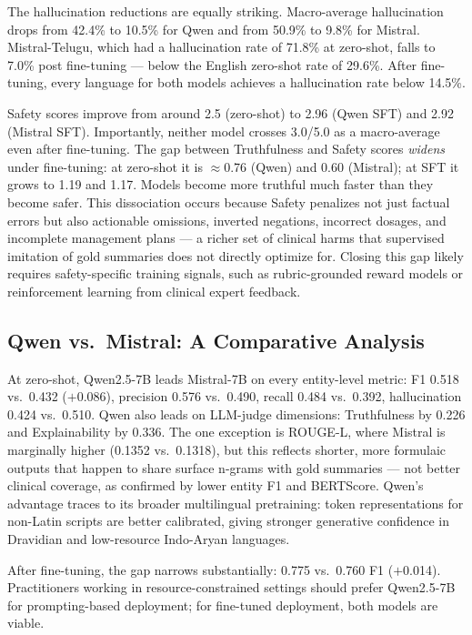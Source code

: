 \documentclass[conference]{IEEEtran}
\begin{document}
The hallucination reductions are equally striking. Macro-average
hallucination drops from 42.4\% to 10.5\% for Qwen and from 50.9\%
to 9.8\% for Mistral. Mistral-Telugu, which had a hallucination rate
of 71.8\% at zero-shot, falls to 7.0\% post fine-tuning --- below the
English zero-shot rate of 29.6\%. After fine-tuning, every language for
both models achieves a hallucination rate below 14.5\%.

Safety scores improve from around 2.5 (zero-shot) to 2.96 (Qwen SFT)
and 2.92 (Mistral SFT). Importantly, neither model crosses 3.0/5.0 as a
macro-average even after fine-tuning. The gap between Truthfulness and
Safety scores \emph{widens} under fine-tuning: at zero-shot it is
$\approx$0.76 (Qwen) and 0.60 (Mistral); at SFT it grows to 1.19 and
1.17. Models become more truthful much faster than they become safer.
This dissociation occurs because Safety penalizes not just factual errors
but also actionable omissions, inverted negations, incorrect dosages, and
incomplete management plans --- a richer set of clinical harms that
supervised imitation of gold summaries does not directly optimize for.
Closing this gap likely requires safety-specific training signals, such
as rubric-grounded reward models or reinforcement learning from clinical
expert feedback.

\subsection{Qwen vs.\ Mistral: A Comparative Analysis}

At zero-shot, Qwen2.5-7B leads Mistral-7B on every entity-level metric:
F1 0.518 vs.\ 0.432 ($+$0.086), precision 0.576 vs.\ 0.490, recall 0.484
vs.\ 0.392, hallucination 0.424 vs.\ 0.510. Qwen also leads on LLM-judge
dimensions: Truthfulness by 0.226 and Explainability by 0.336. The one
exception is ROUGE-L, where Mistral is marginally higher (0.1352 vs.\
0.1318), but this reflects shorter, more formulaic outputs that happen to
share surface n-grams with gold summaries --- not better clinical coverage,
as confirmed by lower entity F1 and BERTScore. Qwen's advantage traces to
its broader multilingual pretraining: token representations for non-Latin
scripts are better calibrated, giving stronger generative confidence in
Dravidian and low-resource Indo-Aryan languages.

After fine-tuning, the gap narrows substantially: 0.775 vs.\ 0.760 F1
($+$0.014). Practitioners working in resource-constrained settings should
prefer Qwen2.5-7B for prompting-based deployment; for fine-tuned
deployment, both models are viable.
\end{document}
